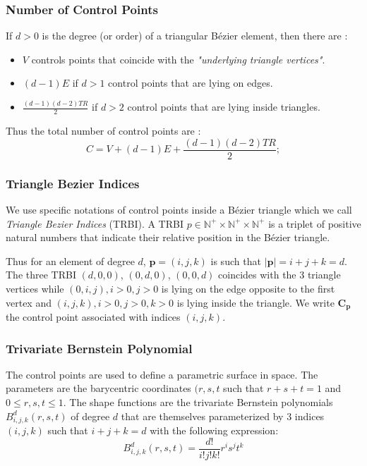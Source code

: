 \documentclass[a4paper,11pt]{article}
\newcommand{\Bezier}{{B{\'e}zier }}
\newcommand{\nvertices}{{ V}}
\newcommand{\nedges}{{ E}}
\newcommand{\ntriangles}{{ TR}}
\newcommand{\ncontrols}{{C}}
\newcommand{\control}{{\mathbf C}}
\newcommand{\degree}{{d}}
\newcommand{\naturalSet}{{\mathbb N}}
\begin{document}
\subsubsection{Number of Control Points}

If $\degree>0$ is the degree (or order) of a triangular \Bezier  element, then there are :

\begin{itemize}
	\item $\nvertices$ controls points that coincide with the {\em "underlying triangle vertices"}.
	\item $(\degree-1) \nedges$ if $\degree>1$ control points that are lying on edges. 
	\item $\frac{(\degree-1) (\degree-2) \ntriangles}{2}$ if $\degree>2$ control points that are lying inside triangles. 
\end{itemize}

Thus the total number of control points are :
\[
\ncontrols=\nvertices+(\degree-1) \nedges+\frac{(\degree-1) (\degree-2) \ntriangles}{2};
\]
\subsubsection{Triangle Bezier Indices}

We use specific notations of control points inside a \Bezier triangle which we call {\em Triangle Bezier Indices} (TRBI).
A TRBI $p\in \naturalSet^{+}\times\naturalSet^{+}\times\naturalSet^{+}$ is a triplet of positive natural numbers that indicate their relative position in the \Bezier triangle. 

Thus for an element of degree $\degree$, ${\mathbf p}=(i,j,k)$ is such that $|{\mathbf p}|=i+j+k=\degree$.  The three TRBI $(\degree,0,0)$, $(0,\degree,0)$, $(0,0,\degree)$ coincides with the 3 triangle vertices while $(0,i,j), i>0, j>0$ is lying on the edge opposite to the first vertex and   $(i,j,k), i>0, j>0, k>0$ is lying inside the triangle. We write $\control_{\mathbf p}$ the control point associated with indices $(i,j,k)$.

\subsubsection{Trivariate Bernstein Polynomial}

The control points are used to define a parametric surface in space. The parameters are the barycentric coordinates $(r,s,t$ such that $r+s+t=1$ and $0\leq r,s,t\leq 1$. The shape functions are the trivariate Bernstein polynomials $B^d_{i,j,k}(r,s,t)$ of degree $d$ that are themselves parameterized by 3 indices $(i,j,k)$ such that $i+j+k=d$ with the following expression:
\[
B^\degree_{i,j,k}(r,s,t)=\frac{\degree!}{i! j! k! } r^i s^j t^k 
\]
\end{document}
